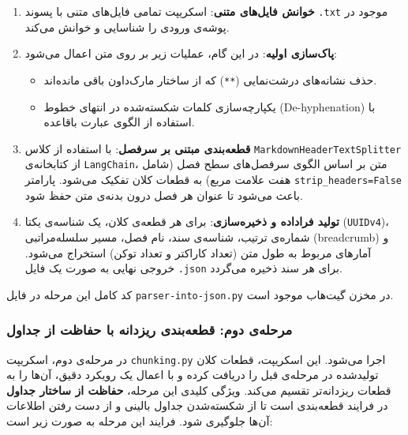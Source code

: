 \begin{enumerate}
	\item \textbf{خوانش فایل‌های متنی}: اسکریپت تمامی فایل‌های متنی با پسوند \texttt{.txt} موجود در پوشه‌ی ورودی را شناسایی و خوانش می‌کند.
	\item \textbf{پاک‌سازی اولیه}: در این گام، عملیات زیر بر روی متن اعمال می‌شود:
	\begin{itemize}
		\item حذف نشانه‌های درشت‌نمایی (\texttt{**}) که از ساختار مارک‌داون باقی مانده‌اند.
		\item یکپارچه‌سازی کلمات شکسته‌شده در انتهای خطوط (De-hyphenation) با استفاده از الگوی عبارت باقاعده.
	\end{itemize}
	\item \textbf{قطعه‌بندی مبتنی بر سرفصل}: با استفاده از کلاس \texttt{MarkdownHeaderTextSplitter} از کتابخانه‌ی \texttt{LangChain}، متن بر اساس الگوی سرفصل‌های سطح فصل (شامل هفت علامت مربع) به قطعات کلان تفکیک می‌شود. پارامتر \texttt{strip\_headers=False} باعث می‌شود تا عنوان هر فصل درون بدنه‌ی متن حفظ شود.
	\item \textbf{تولید فراداده و ذخیره‌سازی}: برای هر قطعه‌ی کلان، یک شناسه‌ی یکتا (\texttt{UUIDv4})، شماره‌ی ترتیب، شناسه‌ی سند، نام فصل، مسیر سلسله‌مراتبی (breadcrumb) و آمارهای مربوط به طول متن (تعداد کاراکتر و تعداد توکن) استخراج می‌شود. خروجی نهایی به صورت یک فایل \texttt{.json} برای هر سند ذخیره می‌گردد.
\end{enumerate}

کد کامل این مرحله در فایل \texttt{parser-into-json.py} در مخزن گیت‌هاب موجود است.

\subsubsection{مرحله‌ی دوم: قطعه‌بندی ریزدانه با حفاظت از جداول}

در مرحله‌ی دوم، اسکریپت \texttt{chunking.py} اجرا می‌شود. این اسکریپت، قطعات کلان تولیدشده در مرحله‌ی قبل را دریافت کرده و با اعمال یک رویکرد دقیق، آن‌ها را به قطعات ریزدانه‌تر تقسیم می‌کند. ویژگی کلیدی این مرحله، \textbf{حفاظت از ساختار جداول} در فرایند قطعه‌بندی است تا از شکسته‌شدن جداول بالینی و از دست رفتن اطلاعات آن‌ها جلوگیری شود. فرایند این مرحله به صورت زیر است:

